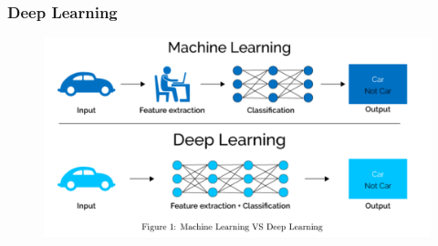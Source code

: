 \documentclass{beamer}
\begin{document}


\begin{frame}
 \frametitle{Deep Learning}
 \begin{figure}[ht!]
 \centering
 \includegraphics[scale=0.15]{deep.png}
\end{figure}
\end{frame}








\end{document}
